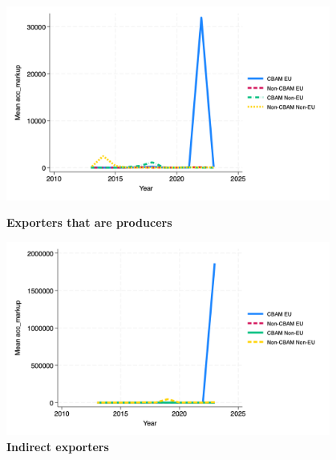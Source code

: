 \documentclass{article}
\begin{document}
\begin{figure}[H]
\centering
\includegraphics[width=0.95\textwidth]{acc_markup_ep.png}
\caption{\textbf{Exporters that are producers}}
\includegraphics[width=0.95\textwidth]{acc_markup_indir.png}
\caption{\textbf{Indirect exporters}}
\end{figure}
\end{document}
